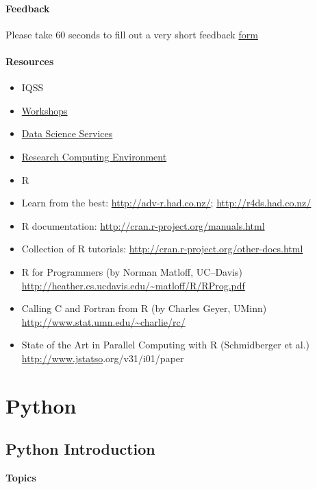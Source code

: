 \documentclass[]{book}
\begin{document}
\subsection{Feedback}\label{feedback-3}

Please take 60 seconds to fill out a very short feedback
\href{http://bit.ly/training_class_eval}{form}

\subsection{Resources}\label{resources-3}

\begin{itemize}
\item
  IQSS
\item
  \href{https://dss.iq.harvard.edu/workshop-materials}{Workshops}
\item
  \href{https://dss.iq.harvard.edu/}{Data Science Services}
\item
  \href{https://iqss.github.io/dss-rce/}{Research Computing Environment}
\item
  R
\item
  Learn from the best: \url{http://adv-r.had.co.nz/};
  \url{http://r4ds.had.co.nz/}
\item
  R documentation: \url{http://cran.r-project.org/manuals.html}
\item
  Collection of R tutorials:
  \url{http://cran.r-project.org/other-docs.html}
\item
  R for Programmers (by Norman Matloff, UC--Davis)
  \url{http://heather.cs.ucdavis.edu/~matloff/R/RProg.pdf}
\item
  Calling C and Fortran from R (by Charles Geyer, UMinn)
  \url{http://www.stat.umn.edu/~charlie/rc/}
\item
  State of the Art in Parallel Computing with R (Schmidberger et al.)
  \url{http://www.jstatso}\textbar{}.org/v31/i01/paper
\end{itemize}

\part{Python}\label{part-python}

\chapter{Python Introduction}\label{python-introduction}

\textbf{Topics}
\end{document}
